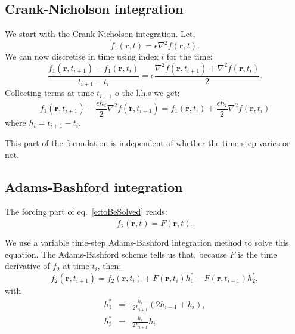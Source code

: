 \documentclass[a4paper,10pt]{book}
\renewcommand{\vec}[1]{\mathbf{#1}}
\begin{document}
\subsection{Crank-Nicholson integration}
We start with the Crank-Nicholson integration. Let,
\begin{equation}
\dot f_1(\vec{r}, t) = \epsilon \nabla^2 f(\vec{r}, t).
\end{equation}
We can now discretise in time using index $i$ for the time:
\begin{equation}
\frac{f_1(\vec{r}, t_{i+1}) -f_1(\vec{r}, t_{i})}{t_{i+1}-t_i}
= \epsilon \frac{\nabla^2 f(\vec{r}, t_{i+1}) + \nabla^2 f(\vec{r}, t_{i})}{2}.
\end{equation}
Collecting terms at time $t_{i+1}$ o the l.h.s we get:
\begin{equation}
f_1(\vec{r}, t_{i+1}) - \frac{\epsilon h_i}{2} \nabla^2 f(\vec{r}, t_{i+1})
= f_1(\vec{r}, t_{i}) +  \frac{\epsilon h_i}{2} \nabla^2 f(\vec{r}, t_{i})
\label{e:CN}
\end{equation}
where $h_i = t_{i+1}-t_i$.

This part of the formulation is independent of whether the time-step varies or
not.


\subsection{Adams-Bashford integration}
The forcing part of eq.~\ref{e:toBeSolved} reads:
\begin{equation}
\dot f_2(\vec{r}, t) = F(\vec{r}, t).
\label{e:AB1}
\end{equation}

We use a variable time-step Adams-Bashford integration method to solve this equation.
The Adams-Bashford scheme tells us that, because $F$ is the time derivative of $f_2$ at time $t_i$, then:
\begin{equation}
 f_2(\vec{r}, t_{i+1}) = f_2(\vec{r}, t_{i}) + F(\vec{r}, t_i) h^*_1 - F(\vec{r}, t_{i-1}) h^*_2,
 \label{e:AB}
\end{equation}
with
\begin{eqnarray}
 h^*_1 & = & \frac{h_i}{2h_{i+1}}(2h_{i-1}+h_i),\\
 h^*_2 & = & \frac{h_i}{2h_{i+1}} h_i.
\end{eqnarray}
\end{document}
